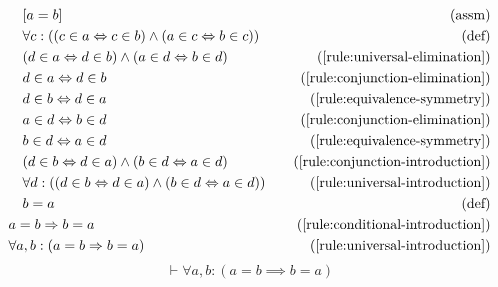 \begin{align*}
    \assumption[1]{a = b}\\
    \bydefinition[1]{\forall c: ((c \in a \lequiv c \in b) \wedge (a \in c \lequiv b \in c))}\\
    \byrule[1]{(d \in a \lequiv d \in b) \wedge (a \in d \lequiv b \in d)}{\ref{rule:universal-elimination}}\\
    \byrule[1]{d \in a \lequiv d \in b}{\ref{rule:conjunction-elimination}}\\
    \byrule[1]{d \in b \lequiv d \in a}{\ref{rule:equivalence-symmetry}}\\
    \byrule[1]{a \in d \lequiv b \in d}{\ref{rule:conjunction-elimination}}\\
    \byrule[1]{b \in d \lequiv a \in d}{\ref{rule:equivalence-symmetry}}\\
    \byrule[1]{(d \in b \lequiv d \in a) \wedge (b \in d \lequiv a \in d)}{\ref{rule:conjunction-introduction}}\\
    \byrule[1]{\forall d: ((d \in b \lequiv d \in a) \wedge (b \in d \lequiv a \in d))}{\ref{rule:universal-introduction}}\\
    \bydefinition[1]{b = a}\\
    \byrule{a = b \implies b = a}{\ref{rule:conditional-introduction}}\\
    \byrule{\forall a, b: (a = b \implies b = a)}{\ref{rule:universal-introduction}}\\
\end{align*}
\begin{equation}
    \vdash \forall a, b: (a = b \implies b = a)
    \label{rule:equality-symmetry}
\end{equation}

